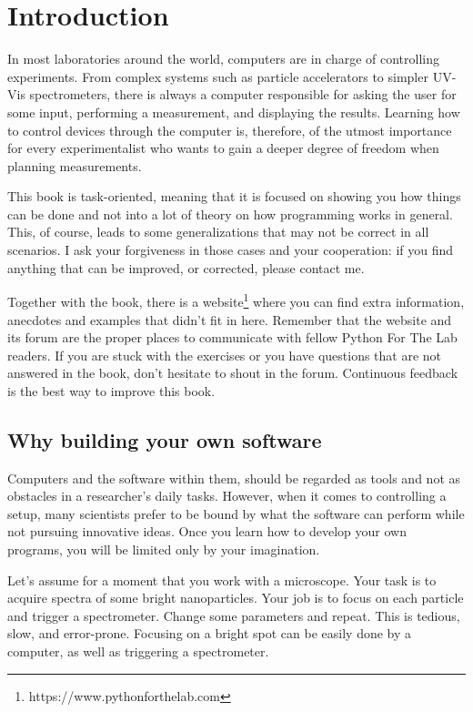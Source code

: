 \chapter{Introduction}
In most laboratories around the world, computers are in charge of controlling experiments. From complex systems such as particle accelerators to simpler UV-Vis spectrometers, there is always a computer responsible for asking the user for some input, performing a measurement, and displaying the results. Learning how to control devices through the computer is, therefore, of the utmost importance for every experimentalist who wants to gain a deeper degree of freedom when planning measurements. 

This book is task-oriented, meaning that it is focused on showing you how things can be done and not into a lot of theory on how programming works in general. This, of course, leads to some generalizations that may not be correct in all scenarios. I ask your forgiveness in those cases and your cooperation: if you find anything that can be improved, or corrected, please contact me.

Together with the book, there is a website\footnote{https://www.pythonforthelab.com} where you can find extra information, anecdotes and examples that didn’t fit in here. Remember that the website and its forum are the proper places to communicate with fellow Python For The Lab readers. If you are stuck with the exercises or you have questions that are not answered in the book, don’t hesitate to shout in the forum. Continuous feedback is the best way to improve this book. 

\section{Why building your own software}
Computers and the software within them, should be regarded as tools and not as obstacles in a researcher's daily tasks. However, when it comes to controlling a setup, many scientists prefer to be bound by what the software can perform while not pursuing innovative ideas. Once you learn how to develop your own programs, you will be limited only by your imagination. 

Let's assume for a moment that you work with a microscope. Your task is to acquire spectra of some bright nanoparticles. Your job is to focus on each particle and trigger a spectrometer. Change some parameters and repeat. This is tedious, slow, and error-prone. Focusing on a bright spot can be easily done by a computer, as well as triggering a spectrometer. 

